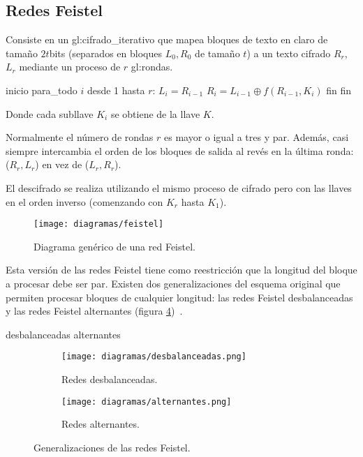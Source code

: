 %
%

\subsection{Redes Feistel}
\label{sec:red_feistel}

Consiste en un \gls{gl:cifrado_iterativo} que mapea bloques de
texto en claro de tamaño $2t$bits (separados en bloques
$L_0, R_0$ de tamaño $t$) a un texto cifrado $R_r$, $L_r$
mediante un proceso de $r$ \glspl{gl:ronda}.

\begin{pseudocodigo}[caption={Feistel, cifrado.}, label={feistel:1}]
  inicio
  para_todo $i$ desde 1 hasta $r$:
    $L_i = R_{i-1}$
    $R_i = L_{i-1} \oplus f(R_{i-1}, K_i)$
  fin
  fin
\end{pseudocodigo}

Donde cada subllave $K_i$ se obtiene de la llave $K$.

Normalmente el número de rondas $r$ es mayor o igual a tres y par.
Además, casi siempre intercambia el orden de los bloques de salida al
revés en la última ronda: ($R_r, L_r$) en vez de ($L_r, R_r$).

El descifrado se realiza utilizando el mismo proceso de cifrado pero
con las llaves en el orden inverso (comenzando con $K_r$ hasta $K_1$).

\begin{figure}[H]
  \begin{center}
    \texttt{[image: diagramas/feistel]}
     \caption{Diagrama genérico de una red Feistel.}
     \label{feistel}
   \end{center}
\end{figure}

Esta versión de las redes Feistel tiene como reestricción que la longitud
del bloque a procesar debe ser par. Existen dos generalizaciones del esquema
original que permiten procesar bloques de cualquier longitud: las redes Feistel
desbalanceadas y las redes Feistel alternantes (figura
\ref{feistel:generalizaciones})~\cite{sinopsis_rogaway}.

{desbalanceadas}
{alternantes}

\begin{figure}[H]
  \centering
  \begin{subfigure}{0.45\textwidth}
    \begin{center}
      \texttt{[image: diagramas/desbalanceadas.png]}
      \caption{Redes desbalanceadas.}
      \label{feistel:desbalanceadas}
    \end{center}
  \end{subfigure}
  \begin{subfigure}{0.45\textwidth}
    \begin{center}
      \texttt{[image: diagramas/alternantes.png]}
      \caption{Redes alternantes.}
      \label{feistel:alternantes}
    \end{center}
  \end{subfigure}
  \caption{Generalizaciones de las redes Feistel.}
  \label{feistel:generalizaciones}
\end{figure}
